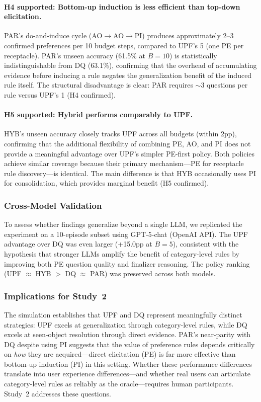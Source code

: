 \documentclass[a4paper,fleqn]{cas-sc}
\begin{document}
\paragraph{H4 supported: Bottom-up induction is less efficient than top-down elicitation.}
PAR's do-and-induce cycle (AO$\to$AO$\to$PI) produces approximately 2--3 confirmed preferences per 10 budget steps, compared to UPF's 5 (one PE per receptacle). PAR's unseen accuracy (61.5\% at $B=10$) is statistically indistinguishable from DQ (63.1\%), confirming that the overhead of accumulating evidence before inducing a rule negates the generalization benefit of the induced rule itself. The structural disadvantage is clear: PAR requires $\sim$3 questions per rule versus UPF's 1 (H4 confirmed).

\paragraph{H5 supported: Hybrid performs comparably to UPF.}
HYB's unseen accuracy closely tracks UPF across all budgets (within 2pp), confirming that the additional flexibility of combining PE, AO, and PI does not provide a meaningful advantage over UPF's simpler PE-first policy. Both policies achieve similar coverage because their primary mechanism---PE for receptacle rule discovery---is identical. The main difference is that HYB occasionally uses PI for consolidation, which provides marginal benefit (H5 confirmed).

\subsubsection{Cross-Model Validation}

To assess whether findings generalize beyond a single LLM, we replicated the experiment on a 10-episode subset using GPT-5-chat (OpenAI API). The UPF advantage over DQ was even larger (+15.0pp at $B=5$), consistent with the hypothesis that stronger LLMs amplify the benefit of category-level rules by improving both PE question quality and finalizer reasoning. The policy ranking (UPF $\approx$ HYB $>$ DQ $\approx$ PAR) was preserved across both models.

\subsubsection{Implications for Study~2}

The simulation establishes that UPF and DQ represent meaningfully distinct strategies: UPF excels at generalization through category-level rules, while DQ excels at seen-object resolution through direct evidence. PAR's near-parity with DQ despite using PI suggests that the value of preference rules depends critically on \emph{how} they are acquired---direct elicitation (PE) is far more effective than bottom-up induction (PI) in this setting. Whether these performance differences translate into user experience differences---and whether real users can articulate category-level rules as reliably as the oracle---requires human participants. Study~2 addresses these questions.
\end{document}
